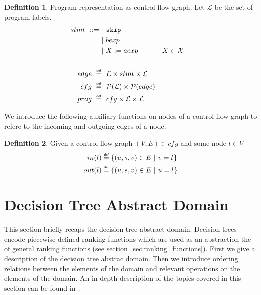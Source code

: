 \documentclass[11pt,a4paper,titlepage]{article}
\theoremstyle{definition}
\newtheorem{definition}{Definition}[section]
\newcommand\eqdef{\mathrel{\overset{\makebox[0pt]{\mbox{\normalfont\tiny\sffamily def}}}{=}}}
\begin{document}
\begin{definition}\label{def:control_flow_graph}
    Program representation as control-flow-graph. 
    Let $\mathcal{L}$ be the set of program labels.
    \begin{align*}
        \setlength{\jot}{15pt}
        stmt \ ::= \ & \ \ \mathtt{skip} \\
        &| \ bexp \\
        &| \ X := aexp  && X \in \mathcal{X} \\
        \\
        edge \ \eqdef & \ \ \mathcal{L} \times stmt \times \mathcal{L}\\
        cfg \ \eqdef & \ \ \mathcal{P}(\mathcal{L}) \times \mathcal{P}(edge)\\
        prog \ \eqdef & \ \ cfg \times \mathcal{L} \times \mathcal{L}
    \end{align*}
\end{definition}

We introduce the following auxiliary functions on nodes of a control-flow-graph to 
refere to the incoming and outgoing edges of a node.

\begin{definition}\label{def:cfg_in}
    Given a control-flow-graph $(V, E) \in cfg$ and some node $l \in V$
    \begin{align*}
        in(l) &\eqdef \{(u, s, v) \in E \ | \ v = l \}\\
        out(l) &\eqdef \{(u, s, v) \in E \ | \ u = l \}\\
    \end{align*}
\end{definition}


\section{Decision Tree Abstract Domain}\label{sec:decision_tree_abstract_domain}

This section briefly recaps the decision tree abstract domain. 
Decision trees encode piecewise-defined ranking functions which are used as an abstraction 
the of general ranking functions (see section~\ref{sec:ranking_functions}). 
First we give a description of the decision tree abstrac domain. 
Then we introduce ordering relations between the elements of the domain and relevant operations on the elements of the domain. 
An in-depth description of the topics covered in this section can be found in~\cite{UrbanPhd}.\\
\end{document}
